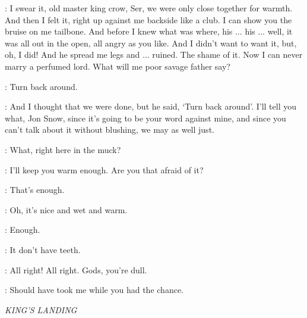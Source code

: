 
\YGRITTE: I swear it, old master king crow, Ser, we were only close together for warmth. And then I felt it, right up against me backside like a club. I can show you the bruise on me tailbone. And before I knew what was where, his $\ldots$ his $\ldots$ well, it was all out in the open, all angry as you like. And I didn't want to want it, but, oh, I did! And he spread me legs and $\ldots$ ruined. The shame of it. Now I can never marry a perfumed lord. What will me poor savage father say?

\JON: Turn back around.

\YGRITTE:  And I thought that we were done, but he said, `Turn back around'. I'll tell you what, Jon Snow, since it's going to be your word against mine, and since you can't talk about it without blushing, we may as well just.

\JON: What, right here in the muck?

\YGRITTE: I'll keep you warm enough. Are you that afraid of it?


\JON: That's enough.


\YGRITTE: Oh, it's nice and wet and warm.

\JON: Enough.

\YGRITTE: It don't have teeth.


\YGRITTE: All right! All right. Gods, you're dull.



\YGRITTE: Should have took me while you had the chance.


\scene

\textit{KING'S LANDING}



